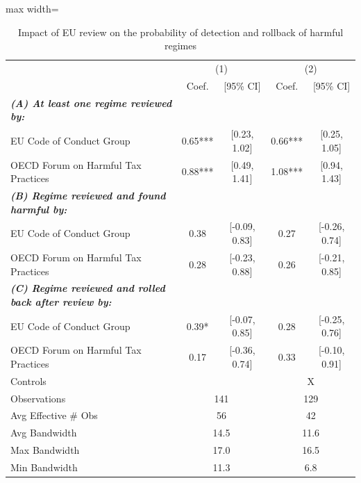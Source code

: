 \begin{table}[t]\centering
\caption{Impact of EU review on the probability of detection and rollback of harmful regimes\label{t:rev}}
\begin{adjustbox}{max width=\textwidth}
\begin{tabular}{l*{4}{c}}
\toprule
&\multicolumn{2}{c}{(1)}&\multicolumn{2}{c}{(2)}\\
&\multicolumn{1}{c}{Coef.}&\multicolumn{1}{c}{[95\% CI]}&\multicolumn{1}{c}{Coef.}&\multicolumn{1}{c}{[95\% CI]}\\
\midrule
\emph{{\bf (A) At least one regime reviewed by:}}&&&&\\
\hspace{.4cm} EU Code of Conduct Group& 0.65*** & [0.23, 1.02]& 0.66*** & [0.25, 1.05]\\
\hspace{.4cm} OECD Forum on Harmful Tax Practices& 0.88*** & [0.49, 1.41]& 1.08*** & [0.94, 1.43]\\
\midrule \emph{{\bf (B) Regime reviewed and found harmful by:}}&&&&\\
\hspace{.4cm} EU Code of Conduct Group& 0.38 & [-0.09, 0.83]& 0.27 & [-0.26, 0.74]\\
\hspace{.4cm} OECD Forum on Harmful Tax Practices& 0.28 & [-0.23, 0.88]& 0.26 & [-0.21, 0.85]\\
\midrule \emph{{\bf (C) Regime reviewed and rolled back after review by:}}&&&&\\
\hspace{.4cm} EU Code of Conduct Group& 0.39* & [-0.07, 0.85]& 0.28 & [-0.25, 0.76]\\
\hspace{.4cm} OECD Forum on Harmful Tax Practices& 0.17 & [-0.36, 0.74]& 0.33 & [-0.10, 0.91]\\
\midrule Controls&\multicolumn{2}{c}{}&\multicolumn{2}{c}{X}\\
Observations&\multicolumn{2}{c}{141}&\multicolumn{2}{c}{129}\\
Avg Effective \# Obs&\multicolumn{2}{c}{ 56}&\multicolumn{2}{c}{ 42}\\
Avg Bandwidth&\multicolumn{2}{c}{14.5}&\multicolumn{2}{c}{11.6}\\
Max Bandwidth&\multicolumn{2}{c}{17.0}&\multicolumn{2}{c}{16.5}\\
Min Bandwidth&\multicolumn{2}{c}{11.3}&\multicolumn{2}{c}{6.8}\\
\bottomrule
\end{tabular}

\end{adjustbox}
\end{table}
